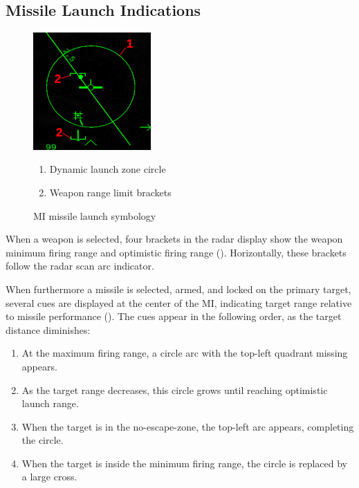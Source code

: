 \subsection{Missile Launch Indications}
\begin{figure}[!ht]
  \centering
  \includegraphics[width=0.4\textwidth]{images/displays/MI-launch.png}

  \begin{multicols}{2}
    \begin{enumerate}[nosep]
      \item \label{item:dlz-disk} Dynamic launch zone circle
      \item \label{item:wpn-range} Weapon range limit brackets
    \end{enumerate}
  \end{multicols}

  \caption{MI missile launch symbology}
  \label{fig:mi-launch}
\end{figure}

When a weapon is selected, four brackets in the radar display show the weapon minimum firing range
and optimistic firing range ().
Horizontally, these brackets follow the radar scan arc indicator.

When furthermore a missile is selected, armed, and locked on the primary target,
several cues are displayed at the center of the MI,
indicating target range relative to missile performance ().
The cues appear in the following order, as the target distance diminishes:
\begin{enumerate}[noitemsep]
  \item At the maximum firing range, a circle arc with the top-left quadrant missing appears.
  \item As the target range decreases, this circle grows until reaching optimistic launch range.
  \item When the target is in the no-escape-zone, the top-left arc appears, completing the circle.
  \item When the target is inside the minimum firing range, the circle is replaced by a large cross.
\end{enumerate}

